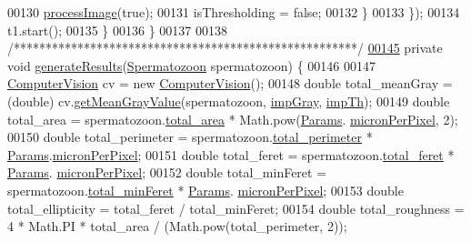 \begin{DoxyCode}
00130           \hyperlink{classgui_1_1_morph_window_a92de44ef00adbefce701ecb95b7d926b}{processImage}(\textcolor{keyword}{true});
00131           isThresholding = \textcolor{keyword}{false};
00132         \}
00133       \});
00134       t1.start();
00135     \}
00136   \}
00137 
00138   \textcolor{comment}{/******************************************************/}
\hypertarget{_morph_window_8java_source_l00145}{}\hyperlink{classgui_1_1_morph_window_ad0a9220fe384d0c206692bc041ef4bb6}{00145}   \textcolor{keyword}{private} \textcolor{keywordtype}{void} \hyperlink{classgui_1_1_morph_window_ad0a9220fe384d0c206692bc041ef4bb6}{generateResults}(\hyperlink{classdata_1_1_spermatozoon}{Spermatozoon} spermatozoon) \{
00146 
00147     \hyperlink{classfunctions_1_1_computer_vision}{ComputerVision} cv = \textcolor{keyword}{new} \hyperlink{classfunctions_1_1_computer_vision}{ComputerVision}();
00148     \textcolor{keywordtype}{double} total\_meanGray = (double) cv.\hyperlink{classfunctions_1_1_computer_vision_af9a3285b7e044506df25989c9f718308}{getMeanGrayValue}(spermatozoon, 
      \hyperlink{classgui_1_1_image_analysis_window_a2f930a4d42790d6f5eec90929df33416}{impGray}, \hyperlink{classgui_1_1_image_analysis_window_a98940a0ff5c7eef6f6347a8c9c98c645}{impTh});
00149     \textcolor{keywordtype}{double} total\_area = spermatozoon.\hyperlink{classdata_1_1_spermatozoon_ac84d85b9355bdffd37cf8632c9f72efe}{total\_area} * Math.pow(\hyperlink{classdata_1_1_params}{Params}.
      \hyperlink{classdata_1_1_params_a19331ee97ef3c422984fc7dff976549e}{micronPerPixel}, 2);
00150     \textcolor{keywordtype}{double} total\_perimeter = spermatozoon.\hyperlink{classdata_1_1_spermatozoon_a893cd9ee5a9bdc16eecb9891fadd602c}{total\_perimeter} * 
      \hyperlink{classdata_1_1_params}{Params}.\hyperlink{classdata_1_1_params_a19331ee97ef3c422984fc7dff976549e}{micronPerPixel};
00151     \textcolor{keywordtype}{double} total\_feret = spermatozoon.\hyperlink{classdata_1_1_spermatozoon_ab5ab64dc3696466f1e700d20d538e436}{total\_feret} * \hyperlink{classdata_1_1_params}{Params}.
      \hyperlink{classdata_1_1_params_a19331ee97ef3c422984fc7dff976549e}{micronPerPixel};
00152     \textcolor{keywordtype}{double} total\_minFeret = spermatozoon.\hyperlink{classdata_1_1_spermatozoon_aea69b99de4cd3bda1fc7c464bb5d842e}{total\_minFeret} * \hyperlink{classdata_1_1_params}{Params}.
      \hyperlink{classdata_1_1_params_a19331ee97ef3c422984fc7dff976549e}{micronPerPixel};
00153     \textcolor{keywordtype}{double} total\_ellipticity = total\_feret / total\_minFeret;
00154     \textcolor{keywordtype}{double} total\_roughness = 4 * Math.PI * total\_area / (Math.pow(total\_perimeter, 2));

\end{DoxyCode}
